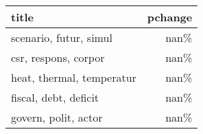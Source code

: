 \begin{tabular}{p{1.2cm}r}
\toprule
                     title &  pchange \\
\midrule
    scenario, futur, simul &     nan\% \\
      csr, respons, corpor &     nan\% \\
 heat, thermal, temperatur &     nan\% \\
     fiscal, debt, deficit &     nan\% \\
      govern, polit, actor &     nan\% \\
\bottomrule
\end{tabular}
